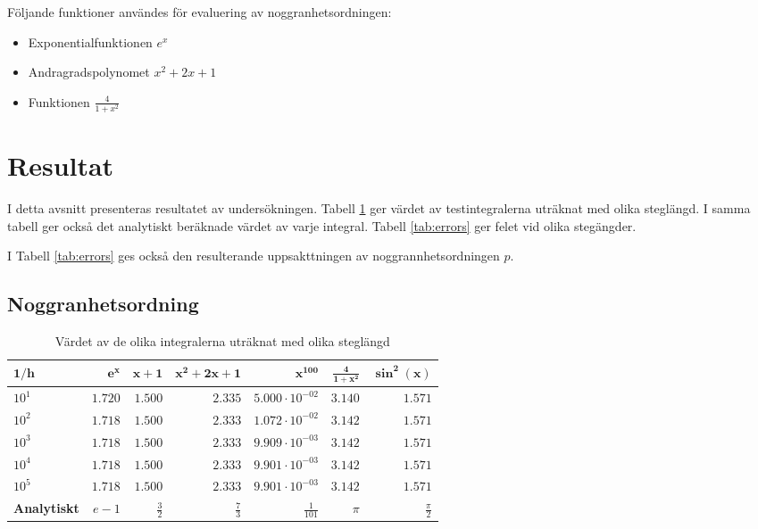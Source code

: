 \documentclass[a4paper,titlepage]{article}
\begin{document}
Följande funktioner användes för evaluering av noggranhetsordningen:

\begin{itemize}
    \item Exponentialfunktionen $e^x$
    \item Andragradspolynomet $x^2 + 2x + 1$
    \item Funktionen $\frac{4}{1 + x^2}$
\end{itemize}

\section{Resultat}

I detta avsnitt presenteras resultatet av undersökningen. Tabell \ref{tab:values}
ger värdet av testintegralerna uträknat med olika steglängd. I samma tabell ger också
det analytiskt beräknade värdet av varje integral. Tabell \ref{tab:errors}
ger felet vid olika stegängder.

I Tabell \ref{tab:errors} ges också den resulterande uppsakttningen av noggrannhetsordningen
$p$.



\subsection{Noggranhetsordning}

\begin{table}[h]
    \centering
    \begin{tabular}{l | r | r | r | r | r | r}
        $\mathbf{1/h}$      & $\mathbf{e^x}$ & $\mathbf{x + 1}$ & $\mathbf{x^2 + 2x + 1}$ & $\mathbf{x^{100}}$     & $\mathbf{\frac{4}{1 + x^2}}$ & $\mathbf{\sin^2(x)}$ \\ \hline
        $10^1$              & $1.720$        & $1.500$          & $2.335$                 & $5.000 \cdot 10^{-02}$ & $3.140$                      & $1.571$ \\
        $10^2$              & $1.718$        & $1.500$          & $2.333$                 & $1.072 \cdot 10^{-02}$ & $3.142$                      & $1.571$ \\
        $10^3$              & $1.718$        & $1.500$          & $2.333$                 & $9.909 \cdot 10^{-03}$ & $3.142$                      & $1.571$ \\
        $10^4$              & $1.718$        & $1.500$          & $2.333$                 & $9.901 \cdot 10^{-03}$ & $3.142$                      & $1.571$ \\
        $10^5$              & $1.718$        & $1.500$          & $2.333$                 & $9.901 \cdot 10^{-03}$ & $3.142$                      & $1.571$ \\ \hline
        \textbf{Analytiskt} & $e-1$          & $\frac{3}{2}$    & $\frac{7}{3}$           & $\frac{1}{101}$        & $\pi$                        & $\frac{\pi}{2}$ \\
    \end{tabular}
    \caption{Värdet av de olika integralerna uträknat med olika steglängd}
    \label{tab:values}
\end{table}
\end{document}
